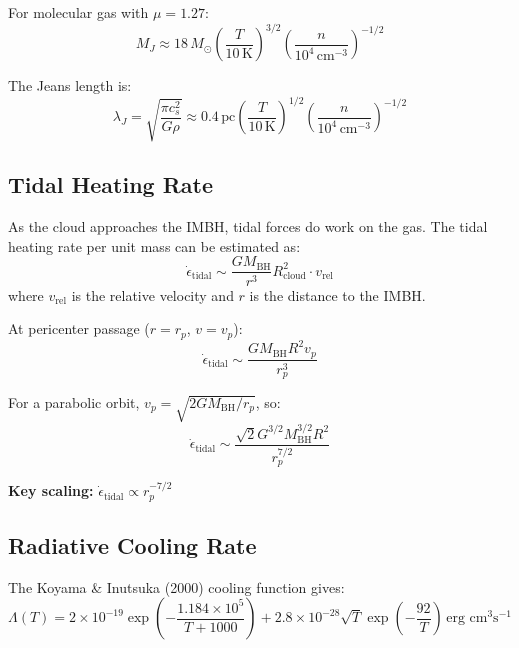 \documentclass[12pt,a4paper]{article}
\begin{document}
For molecular gas with $\mu = 1.27$:
\begin{equation}
    \boxed{M_J \approx 18 \, M_\odot \left(\frac{T}{10 \, \text{K}}\right)^{3/2}
    \left(\frac{n}{10^4 \, \text{cm}^{-3}}\right)^{-1/2}}
\end{equation}

The Jeans length is:
\begin{equation}
    \lambda_J = \sqrt{\frac{\pi c_s^2}{G \rho}} \approx 0.4 \, \text{pc}
    \left(\frac{T}{10 \, \text{K}}\right)^{1/2}
    \left(\frac{n}{10^4 \, \text{cm}^{-3}}\right)^{-1/2}
\end{equation}

\subsection{Tidal Heating Rate}

As the cloud approaches the IMBH, tidal forces do work on the gas. The tidal
heating rate per unit mass can be estimated as:
\begin{equation}
    \dot{\epsilon}_{\text{tidal}} \sim \frac{G M_{\text{BH}}}{r^3} R_{\text{cloud}}^2
    \cdot v_{\text{rel}}
\end{equation}
where $v_{\text{rel}}$ is the relative velocity and $r$ is the distance to the IMBH.

At pericenter passage ($r = r_p$, $v = v_p$):
\begin{equation}
    \dot{\epsilon}_{\text{tidal}} \sim \frac{G M_{\text{BH}} R^2 v_p}{r_p^3}
\end{equation}

For a parabolic orbit, $v_p = \sqrt{2 G M_{\text{BH}} / r_p}$, so:
\begin{equation}
    \boxed{\dot{\epsilon}_{\text{tidal}} \sim \frac{\sqrt{2} G^{3/2} M_{\text{BH}}^{3/2} R^2}{r_p^{7/2}}}
\end{equation}

\textbf{Key scaling:} $\dot{\epsilon}_{\text{tidal}} \propto r_p^{-7/2}$

\subsection{Radiative Cooling Rate}

The Koyama \& Inutsuka (2000) cooling function gives:
\begin{equation}
    \Lambda(T) = 2 \times 10^{-19} \exp\left(-\frac{1.184 \times 10^5}{T + 1000}\right)
    + 2.8 \times 10^{-28} \sqrt{T} \exp\left(-\frac{92}{T}\right)
    \, \text{erg cm}^3 \text{s}^{-1}
\end{equation}
\end{document}
